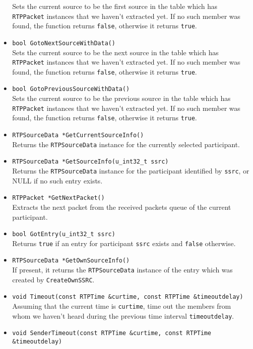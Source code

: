 \documentclass[12pt,a4paper]{article}
\begin{document}
\begin{itemize}
						Sets the current source to be the first source in the table
						which has {\tt RTPPacket} instances that we haven't extracted
						yet. If no such member was found, the function returns {\tt false},
						otherwise it returns {\tt true}.
					\item {\tt bool GotoNextSourceWithData()}\\
						Sets the current source to be the next source in the table
						which has {\tt RTPPacket} instances that we haven't extracted
						yet. If no such member was found, the function returns {\tt false},
						otherwise it returns {\tt true}.
					\item {\tt bool GotoPreviousSourceWithData()}\\
						Sets the current source to be the previous source in the table
						which has {\tt RTPPacket} instances that we haven't extracted
						yet. If no such member was found, the function returns {\tt false},
						otherwise it returns {\tt true}.
					\item {\tt RTPSourceData *GetCurrentSourceInfo()}\\
						Returns the {\tt RTPSourceData} instance for the currently
						selected participant.
					\item {\tt RTPSourceData *GetSourceInfo(u\_int32\_t ssrc)}\\
						Returns the {\tt RTPSourceData} instance for the participant
						identified by {\tt ssrc}, or NULL if no such entry exists.
					\item {\tt RTPPacket *GetNextPacket()}\\
						Extracts the next packet from the received packets queue
						of the current participant.
					\item {\tt bool GotEntry(u\_int32\_t ssrc)}\\
						Returns {\tt true} if an entry for participant {\tt ssrc} exists
						and {\tt false} otherwise.
					\item {\tt RTPSourceData *GetOwnSourceInfo()}\\
						If present, it returns the {\tt RTPSourceData} instance of
						the entry which was created by {\tt CreateOwnSSRC}.
					\item {\tt void Timeout(const RTPTime \&curtime, const RTPTime \&timeoutdelay)}\\
						Assuming that the current time is {\tt curtime}, time out the
						members from whom we haven't heard during the previous time
						interval {\tt timeoutdelay}.
					\item {\tt void SenderTimeout(const RTPTime \&curtime, const RTPTime \&timeoutdelay)}\\

\end{itemize}
\end{document}
